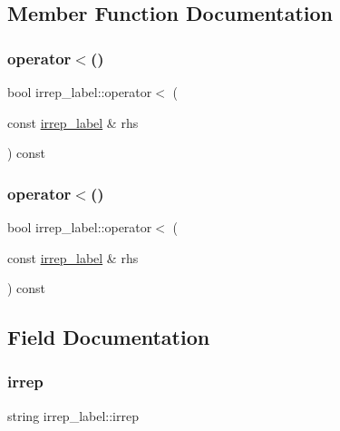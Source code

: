 \subsection{Member Function Documentation}
\mbox{\label{structirrep__label_aed7f86acf9c55f4007a313bbd72485e1}} 
\subsubsection{\texorpdfstring{operator$<$()}{operator<()}\hspace{0.1cm}{\footnotesize\ttfamily [1/2]}}
{\footnotesize\ttfamily bool irrep\+\_\+label\+::operator$<$ (\begin{DoxyParamCaption}\item[{const \mbox{\hyperlink{structirrep__label}{irrep\+\_\+label}} \&}]{rhs }\end{DoxyParamCaption}) const}

\mbox{\label{structirrep__label_aed7f86acf9c55f4007a313bbd72485e1}} 
\subsubsection{\texorpdfstring{operator$<$()}{operator<()}\hspace{0.1cm}{\footnotesize\ttfamily [2/2]}}
{\footnotesize\ttfamily bool irrep\+\_\+label\+::operator$<$ (\begin{DoxyParamCaption}\item[{const \mbox{\hyperlink{structirrep__label}{irrep\+\_\+label}} \&}]{rhs }\end{DoxyParamCaption}) const}



\subsection{Field Documentation}
\mbox{\label{structirrep__label_a21e18e087b0a2a1d22886c0244d7e7e6}} 
\subsubsection{\texorpdfstring{irrep}{irrep}}
{\footnotesize\ttfamily string irrep\+\_\+label\+::irrep}

